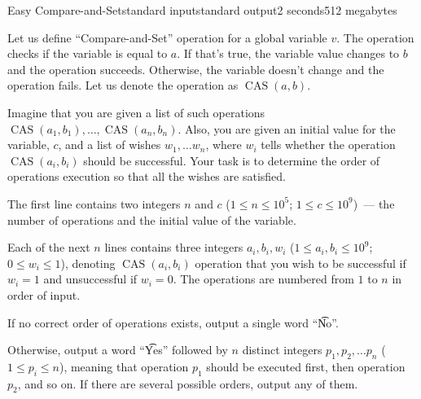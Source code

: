 \begin{problem}{Easy Compare-and-Set}{standard input}{standard output}{2 seconds}{512 megabytes}

Let us define ``Compare-and-Set'' operation for a global variable $v$. The operation checks if the variable is equal to $a$. If that's true, the variable value changes to $b$ and the operation succeeds. Otherwise, the variable doesn't change and the operation fails. Let us denote the operation as $\operatorname{CAS}(a,b)$.

Imagine that you are given a list of such operations $\operatorname{CAS}(a_1,b_1), \dots, \operatorname{CAS}(a_n,b_n)$. Also, you are given an initial value for the variable, $c$, and a list of wishes $w_1, \dots w_n$, where $w_i$ tells whether the operation $\operatorname{CAS}(a_i,b_i)$ should be successful. Your task is to determine the order of operations execution so that all the wishes are satisfied.

\InputFile
The first line contains two integers $n$ and $c$ ($1 \le n \le 10^5$; $1 \le c \le 10^9$)~--- the number of operations and the initial value of the variable.

Each of the next $n$ lines contains three integers $a_i, b_i, w_i$ ($1 \le a_i, b_i \le 10^9$; $0 \le w_i \le 1$), denoting $\operatorname{CAS}(a_i, b_i)$ operation that you wish to be successful if $w_i = 1$ and unsuccessful if $w_i = 0$. The operations are numbered from $1$ to $n$ in order of input.

\OutputFile
If no correct order of operations exists, output a single word ``\t{No}''.

Otherwise, output a word ``\t{Yes}'' followed by $n$ distinct integers $p_1, p_2, \ldots p_n$ ($1 \le p_i \le n$), meaning that operation $p_1$ should be executed first, then operation $p_2$, and so on. 
If there are several possible orders, output any of them.


\Examples

\begin{example}
%
%
\end{example}

\end{problem}

